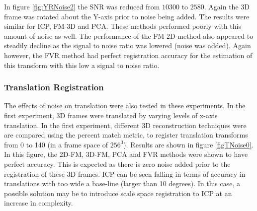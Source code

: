 In figure \ref{fig:YRNoise2} the SNR was reduced from $10300$ to $2580$. Again the 3D frame was rotated about the Y-axis prior to noise being added. The results were similar for ICP, FM-3D and PCA. These methods performed poorly with this amount of noise as well. The performance of the FM-2D method also appeared to steadily decline as the signal to noise ratio was lowered (noise was added). Again however, the FVR method had perfect registration accuracy for the estimation of this transform with this low a signal to noise ratio. \\

\subsubsection{Translation Registration}

The effects of noise on translation were also tested in these experiments. In the first experiment, 3D frames were translated by varying levels of x-axis translation. In the first experiment, different 3D reconstruction techniques were are compared using the percent match metric, to register translation transforms from 0 to 140 (in a frame space of $256^3$). Results are shown in figure \ref{figTNoise0}. In this figure, the 2D-FM, 3D-FM, PCA and FVR methods were shown to have perfect accuracy. This is expected as there is zero noise added prior to the registration of these 3D frames. ICP can be seen falling in terms of accuracy in translations with too wide a base-line (larger than 10 degrees). In this case, a possible solution may be to introduce scale space registration to ICP at an increase in complexity. \\  

\begin{table}[!htb]
\centering
{}
\\
\caption{Average percent matched registration results for data translated 0 to 140 voxels under varying noise conditions.}
\label{table:TNoiseT}
\end{table}


